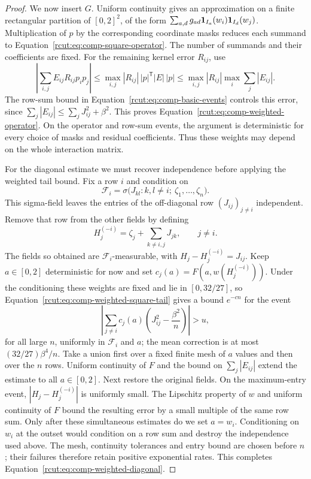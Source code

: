 \begin{proof}
 We now insert $G$.  Uniform continuity gives an approximation on a
 finite rectangular partition of $[0,2]^2$, of the form
 $\sum_{a,d}g_{ad}\mathbf 1_{I_a}(w_i)\mathbf 1_{I_d}(w_j)$.
 Multiplication of $p$ by the corresponding coordinate masks reduces
 each summand to Equation~\eqref{rcut:eq:comp-square-operator}.  The
 number of summands and their coefficients are fixed.  For the
 remaining kernel error $R_{ij}$, use
 \[
  \left|\sum_{i,j}E_{ij}R_{ij}p_ip_j\right|
   \le\max_{i,j}|R_{ij}|\,
          |p|^{\mathsf T}|E|\,|p|
   \le\max_{i,j}|R_{ij}|\max_i\sum_j|E_{ij}|.
 \]
 The row-sum bound in Equation~\eqref{rcut:eq:comp-basic-events}
 controls this error, since
 $\sum_j|E_{ij}|\le\sum_jJ_{ij}^2+\beta^2$.
 This proves Equation~\eqref{rcut:eq:comp-weighted-operator}.  On the
 operator and row-sum events, the argument is deterministic for every
 choice of masks and residual coefficients.  Thus these weights may
 depend on the whole interaction matrix.

 For the diagonal estimate we must recover independence before applying
 the weighted tail bound.  Fix a row $i$ and condition on
 \[
  \mathcal F_i=\sigma\bigl(J_{kl}:k,l\ne i;\ \zeta_1,\ldots,\zeta_n\bigr).
 \]
 This sigma-field leaves the entries of the off-diagonal row
 $(J_{ij})_{j\ne i}$ independent.  Remove that row from the other
 fields by defining
 \[
  H_j^{(-i)}=\zeta_j+\sum_{k\ne i,j}J_{jk},\qquad j\ne i.
 \]
 The fields so obtained are $\mathcal F_i$-measurable, with
 $H_j-H_j^{(-i)}=J_{ij}$.  Keep $a\in[0,2]$ deterministic for now
 and set $c_j(a)=F(a,w(H_j^{(-i)}))$.  Under the conditioning these
 weights are fixed and lie in $[0,32/27]$, so
 Equation~\eqref{rcut:eq:comp-weighted-square-tail} gives a bound
 $e^{-cn}$ for the event
 \[
  \left|\sum_{j\ne i}c_j(a)
      \left(J_{ij}^2-\frac{\beta^2}{n}\right)\right|>u,
 \]
 for all large $n$, uniformly in $\mathcal F_i$ and $a$; the mean
 correction is at most $(32/27)\beta^4/n$.
 Take a union first over a fixed finite mesh of $a$ values and then
 over the $n$ rows.  Uniform continuity of $F$ and the bound on
 $\sum_j|E_{ij}|$ extend the estimate to all $a\in[0,2]$.
 Next restore the original fields.  On the maximum-entry event,
 $|H_j-H_j^{(-i)}|$ is uniformly small.  The Lipschitz property of
 $w$ and uniform continuity of $F$ bound the resulting error by a
 small multiple of the same row sum.  Only after these simultaneous
 estimates do we set $a=w_i$.  Conditioning on $w_i$ at the outset
 would condition on a row sum and destroy the independence used above.
 The mesh, continuity tolerances and entry bound are chosen before $n$;
 their failures therefore retain positive exponential rates.  This
 completes Equation~\eqref{rcut:eq:comp-weighted-diagonal}.
\end{proof}

